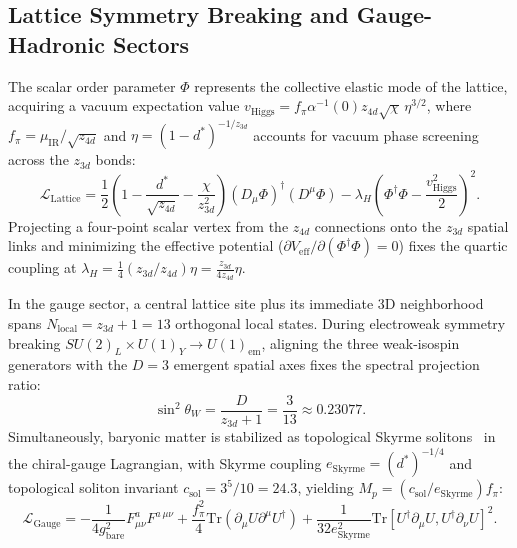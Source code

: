 \documentclass[11pt,a4paper]{article}
\begin{document}
\subsection{Lattice Symmetry Breaking and Gauge-Hadronic Sectors}
The scalar order parameter $\Phi$ represents the collective elastic mode of the lattice, acquiring a vacuum expectation value $v_{\text{Higgs}} = f_\pi \alpha^{-1}(0) z_{4d} \sqrt{\chi}\,\eta^{3/2}$, where $f_\pi = \mu_{\text{IR}}/\sqrt{z_{4d}}$ and $\eta = (1 - d^*)^{-1/z_{3d}}$ accounts for vacuum phase screening across the $z_{3d}$ bonds:
\begin{equation}
    \mathcal{L}_{\text{Lattice}} = \frac{1}{2}\left(1 - \frac{d^*}{\sqrt{z_{4d}}} - \frac{\chi}{z_{3d}^2}\right)(D_\mu \Phi)^\dagger (D^\mu \Phi) - \lambda_H \left(\Phi^\dagger \Phi - \frac{v_{\text{Higgs}}^2}{2}\right)^2.
\end{equation}
Projecting a four-point scalar vertex from the $z_{4d}$ connections onto the $z_{3d}$ spatial links and minimizing the effective potential ($\partial V_{\text{eff}}/\partial(\Phi^\dagger\Phi) = 0$) fixes the quartic coupling at $\lambda_H = \frac{1}{4}(z_{3d}/z_{4d})\eta = \frac{z_{3d}}{4z_{4d}}\eta$.

In the gauge sector, a central lattice site plus its immediate 3D neighborhood spans $N_{\text{local}} = z_{3d} + 1 = 13$ orthogonal local states. During electroweak symmetry breaking $SU(2)_L \times U(1)_Y \to U(1)_{\text{em}}$, aligning the three weak-isospin generators with the $D = 3$ emergent spatial axes fixes the spectral projection ratio:
\begin{equation}
    \sin^2\theta_W = \frac{D}{z_{3d} + 1} = \frac{3}{13} \approx 0.23077.
\end{equation}
Simultaneously, baryonic matter is stabilized as topological Skyrme solitons~\cite{Skyrme1961} in the chiral-gauge Lagrangian, with Skyrme coupling $e_{\text{Skyrme}} = (d^*)^{-1/4}$ and topological soliton invariant $c_{\text{sol}} = 3^5/10 = 24.3$, yielding $M_p = (c_{\text{sol}}/e_{\text{Skyrme}})f_\pi$:
\begin{equation}
    \mathcal{L}_{\text{Gauge}} = -\frac{1}{4g_{\text{bare}}^2} F^a_{\mu\nu} F^{a\,\mu\nu} + \frac{f_\pi^2}{4}\text{Tr}(\partial_\mu U \partial^\mu U^\dagger) + \frac{1}{32 e_{\text{Skyrme}}^2}\text{Tr}[U^\dagger \partial_\mu U, U^\dagger \partial_\nu U]^2.
\end{equation}
\end{document}

